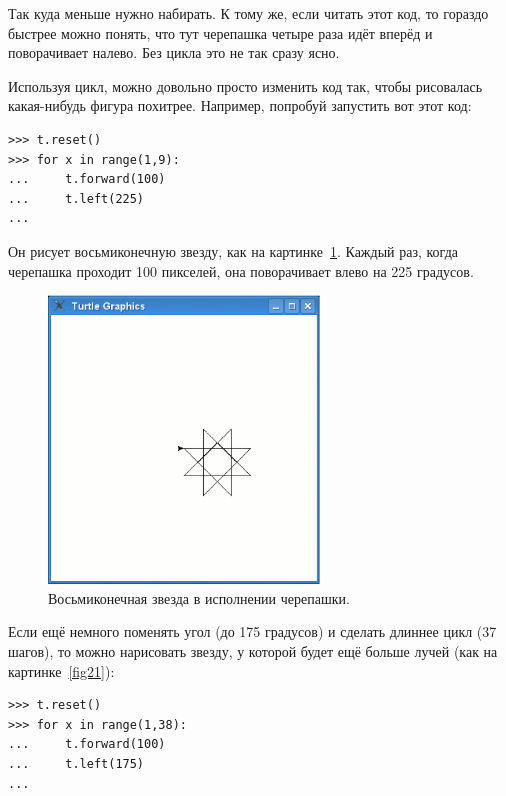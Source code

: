 Так куда меньше нужно набирать. К тому же, если читать этот код, то гораздо быстрее можно понять, что тут черепашка четыре раза идёт вперёд и поворачивает налево. Без цикла это не так сразу ясно.

Используя цикл, можно довольно просто изменить код так, чтобы рисовалась какая-нибудь фигура похитрее. Например, попробуй запустить вот этот код:

\begin{listing}
\begin{verbatim}
>>> t.reset()
>>> for x in range(1,9):
...     t.forward(100)
...     t.left(225)
...
\end{verbatim}
\end{listing}

Он рисует восьмиконечную звезду, как на картинке \ref{fig20}. Каждый раз, когда черепашка проходит 100 пикселей, она поворачивает влево на 225 градусов.

\begin{figure}
\begin{center}
\includegraphics[width=72mm]{../en/figure20.eps}
\end{center}
\caption{Восьмиконечная звезда в исполнении черепашки.}\label{fig20}
\end{figure}

Если ещё немного поменять угол (до 175 градусов) и сделать длиннее цикл (37 шагов), то можно нарисовать звезду, у которой будет ещё больше лучей (как на картинке \ref{fig21}):

\begin{listing}
\begin{verbatim}
>>> t.reset()
>>> for x in range(1,38):
...     t.forward(100)
...     t.left(175)
...
\end{verbatim}
\end{listing}

